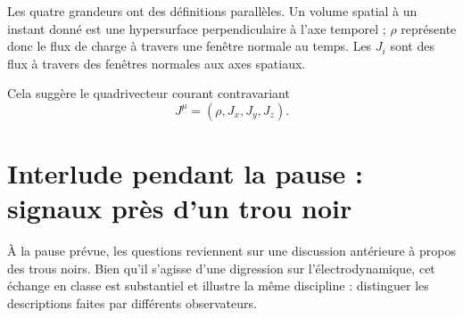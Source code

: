 Les quatre grandeurs ont des définitions parallèles. Un volume spatial à un instant donné est une hypersurface perpendiculaire à l’axe temporel ; \(\rho\) représente donc le flux de charge à travers une fenêtre normale au temps. Les \(J_i\) sont des flux à travers des fenêtres normales aux axes spatiaux.

\begin{classroomqa}
\end{classroomqa}

Cela suggère le quadrivecteur courant contravariant
\begin{equation}
J^\mu
=
(\rho,J_x,J_y,J_z).
\label{eq:four-current}
\end{equation}

\begin{classroomqa}
\end{classroomqa}

\section{Interlude pendant la pause : signaux près d’un trou noir}

À la pause prévue, les questions reviennent sur une discussion antérieure à propos des trous noirs. Bien qu’il s’agisse d’une digression sur l’électrodynamique, cet échange en classe est substantiel et illustre la même discipline : distinguer les descriptions faites par différents observateurs.

